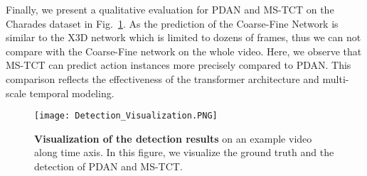 \documentclass[10pt,twocolumn,letterpaper]{article}
\begin{document}
Finally, we present a qualitative evaluation for PDAN and MS-TCT on the Charades dataset in Fig.~\ref{fig:detection_visual}. As the prediction of the Coarse-Fine Network is similar to the X3D network which is limited to dozens of frames, thus we can not compare with the Coarse-Fine network on the whole video. Here, we observe that MS-TCT can predict action instances more precisely compared to PDAN. This comparison reflects the effectiveness of the transformer architecture and multi-scale temporal modeling.  




\begin{figure}[t!]
\centering
\texttt{[image: Detection\_Visualization.PNG]}\vspace{-0.1in}
\caption{\textbf{Visualization of the detection results} on an example video  along time axis. In this figure, we visualize the ground truth and the detection of PDAN and MS-TCT. 
}
\label{fig:detection_visual}
\end{figure}


\begin{table}[htp]
\begin{floatrow}
 \tabcolsep=9pt
\begin{floatrow}
\hspace{-0.7cm}
\end{floatrow}

\hspace{-0.6cm}
\renewcommand\arraystretch{1.0} 
\end{floatrow}
\end{table}
\end{document}
